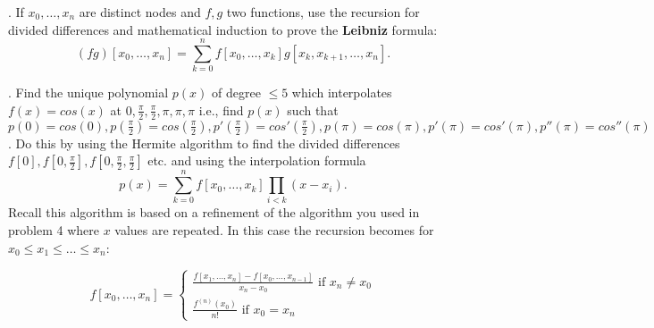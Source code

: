 \documentclass[12 pt]{article}
\begin{document}
\medskip

. If $x_0, \dots, x_n$ are distinct nodes and $f, g$ two functions, use the recursion for divided differences and mathematical induction to 
prove the {\bf Leibniz} formula:
$$
(fg)[x_0, \dots, x_n] = \sum_{k=0}^n f[x_0,\dots,x_k]g[x_k, x_{k+1}, \dots, x_n].
$$

\medskip

. Find the unique polynomial $p(x)$ of degree $\leq 5$ which interpolates $f(x)=cos(x)$ at $0,\frac{\pi}{2},\frac{\pi}{2}, \pi, \pi, \pi$ i.e., find 
$p(x)$ such that $p(0)=cos(0), p(\frac{\pi}{2})=cos(\frac{\pi}{2}), p'(\frac{\pi}{2})=cos'(\frac{\pi}{2}), p(\pi)=cos(\pi), p'(\pi)=cos'(\pi), p''(\pi)=cos''(\pi)$. 
Do this by using the Hermite algorithm to find the divided differences \\ $f[0], f[0, \frac{\pi}{2}], f[0, \frac{\pi}{2}, \frac{\pi}{2}]$ etc. and using the interpolation formula 
$$
p(x) = \sum_{k=0}^n f[x_0,\dots, x_k] \prod_{i < k} (x-x_i).
$$
Recall this algorithm is based on a refinement of the algorithm you used in problem 4 where $x$ values are repeated. In this case the recursion becomes
for $x_0 \leq x_1 \leq \dots \leq x_n$:

$$
f[x_0, \dots, x_n] = \begin{cases} \frac{f[x_1,\dots,x_n] - f[x_0, \dots, x_{n-1}]}{x_n-x_0} \text{ if } x_n \neq x_0 \\
\frac{f^{(n)}(x_0)}{n!} \text{ if } x_0=x_n
\end{cases}
$$
\end{document}
